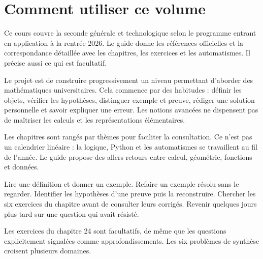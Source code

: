 \documentclass[11pt,a4paper,oneside]{book}
\begin{document}
\frontmatter
\chapter*{Comment utiliser ce volume}
Ce cours couvre la seconde générale et technologique selon le programme entrant en application à la rentrée 2026. Le guide donne les références officielles et la correspondance détaillée avec les chapitres, les exercices et les automatismes. Il précise aussi ce qui est facultatif.

Le projet est de construire progressivement un niveau permettant d'aborder des mathématiques universitaires. Cela commence par des habitudes : définir les objets, vérifier les hypothèses, distinguer exemple et preuve, rédiger une solution personnelle et savoir expliquer une erreur. Les notions avancées ne dispensent pas de maîtriser les calculs et les représentations élémentaires.

Les chapitres sont rangés par thèmes pour faciliter la consultation. Ce n'est pas un calendrier linéaire : la logique, Python et les automatismes se travaillent au fil de l'année. Le guide propose des allers-retours entre calcul, géométrie, fonctions et données.

\begin{methode}
Lire une définition et donner un exemple. Refaire un exemple résolu sans le regarder. Identifier les hypothèses d'une preuve puis la reconstruire. Chercher les six exercices du chapitre avant de consulter leurs corrigés. Revenir quelques jours plus tard sur une question qui avait résisté.
\end{methode}
Les exercices du chapitre 24 sont facultatifs, de même que les questions explicitement signalées comme approfondissements. Les six problèmes de synthèse croisent plusieurs domaines.
\end{document}
